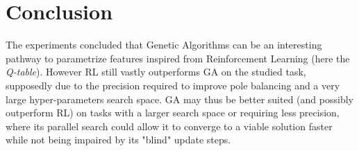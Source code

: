 \section{Conclusion}

The experiments concluded that Genetic Algorithms can be an interesting pathway to parametrize features inspired from Reinforcement Learning (here the \textit{Q-table}).
However RL still vastly outperforms GA on the studied task, supposedly due to the precision required to improve pole balancing and a very large hyper-parameters search space.
GA may thus be better suited (and possibly outperform RL) on tasks with a larger search space or requiring less precision, where its parallel search could allow it to converge to a viable solution faster while not being impaired by its "blind" update steps.

